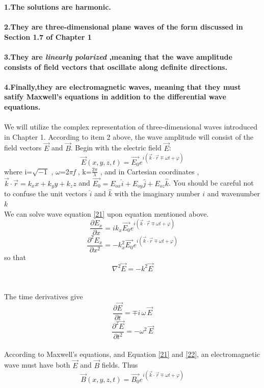 \documentclass[12pt]{article}
\numberwithin{equation}{section}
\begin{document}
\indent \textbf{1.The solutions are harmonic.}
\\
\\
\indent \textbf{2.They are three-dimensional plane waves of the form discussed in Section 1.7 of Chapter 1}
\\
\\
\indent \textbf{3.They are \emph{linearly polarized} ,meaning that the wave amplitude consists of field vectors that oscillate along definite directions.}
\\
\\
\indent \textbf{4.Finally,they are electromagnetic waves, meaning that they must satify Maxwell's equations in addition to the differential wave equations.}
\\
\\
\indent We will utilize the complex representation of three-dimensional waves introduced in Chapter 1. According to item 2 above, the wave amplitude will consist of the field vectors $\vec{E}$ and $\vec{B}$. Begin with the electric field $\vec{E}$:
\begin{equation}
    \vec{E}(x,y,z,t)=\vec{E_0}e^{i(\vec{k}\cdot\vec{r}\mp\omega t +\varphi)}\label{31}
\end{equation}
where i=$\sqrt{-1}$ , $\omega$=2$\pi$\emph{f} , k=$\frac{2\pi}{\lambda}$ , and in Cartesian coordinates , $\vec{k}\cdot\vec{r}=k_xx+k_yy+k_zz$ and $\vec{E_0}=E_{ox}\hat{i}+E_{oy}\hat{j}+E_{oz}\hat{k}$. You should be careful not to confuse the unit vectors $\hat{i}$ and $\hat{k}$ with the imaginary number $i$ and wavenumber $k$\\
\indent We can solve wave equation \eqref{21} upon equation mentioned above.
\\
\[
    \frac{\partial E_x}{\partial x}=ik_x\vec{E_0}e^{i(\vec{k}\cdot\vec{r}\mp\omega t +\varphi)}
\]
\[
    \frac{\partial^2 E_x}{\partial x^2}=-k_x^2\vec{E_0}e^{i(\vec{k}\cdot\vec{r}\mp\omega t +\varphi)}
\]
so that
\\
\[
    \nabla^2 \vec{E}=-k^2\vec{E}
\]
\\
\\
The time derivatives give
\[
    \frac{\partial \vec{E}}{\partial t}=\mp i\,\omega\,\vec{E}
\]
\[
    \frac{\partial^2 \vec{E}}{\partial t^2}=-\omega^2\,\vec{E}
\]
\\
\indent According to Maxwell's equations, and Equation \eqref{21} and \eqref{22}, an electromagnetic wave must have both $\vec{E}$ and $\vec{B}$ fields. Thus
\begin{equation}
    \vec{B}(x,y,z,t)=\vec{B_0}e^{i(\vec{k}\cdot\vec{r}\mp\omega t +\varphi)}\label{32}
\end{equation} 
\end{document}
